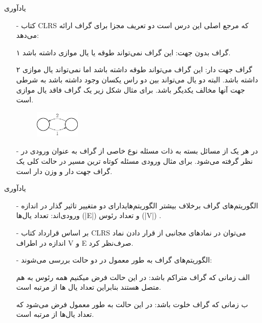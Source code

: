 \begin{frame}{يادآوری}
	\begin{itemize}\itemr
		\item[-]
کتاب CLRS که مرجع اصلی این درس است دو تعریف مجزا برای گراف ارائه می‌دهد:
\item[۱]
گراف بدون جهت: این گراف نمی‌تواند طوقه یا یال موازی داشته باشد.
\item[۲]
گراف جهت دار: این گراف می‌تواند طوقه داشته باشد اما نمی‌تواند یال موازی داشته باشد. البته دو یال می‌تواند بین دو راس یکسان وجود داشته باشد به شرطی جهت آنها مخالف یکدیگر باشد. برای مثال شکل زیر یک گراف فاقد یال موازی است.

\begin{figure}[h!]
\centering
\includegraphics[width=0.2\textwidth]{figs/chap01/1.png}
\end{figure}
\item[-]
در هر یک از مسائل بسته به ذات مسئله نوع خاصی از گراف به عنوان ورودی در نظر گرفته می‌شود. برای مثال ورودی مسئله کوتاه ترین مسیر در حالت کلی یک گراف جهت دار و وزن دار است.
\end{itemize}
\end{frame}


\begin{frame}{يادآوری}
	\begin{itemize}\itemr
\item[-]
الگوریتم‌های گراف برخلاف بیشتر الگوریتم‌هایدارای دو متغییر تاثیر گذار در اندازه ورودی‌اند: تعداد یال‌ها (|E|) و تعداد رئوس (|V|) .
\item[-]
بر اساس قرارداد کتاب CLRS می‌توان در نمادهای مجانبی از قرار دادن نماد اندازه در اطراف V و E صرف‌نظر ‌کرد.

\item[-]
الگوریتم‌های گراف به طور معمول در دو حالت بررسی می‌شوند:
\item[الف]
زمانی که گراف متراکم باشد: در این حالت فرض میکنیم همه رئوس به هم متصل هستند بنابراین تعداد یال ها از مرتبه
است.
\item[ب]
زمانی که گراف خلوت باشد:‌ در این حالت به طور معمول فرض می‌شود که تعداد یال‌ها از مرتبه
است.

	\end{itemize}
\end{frame}

